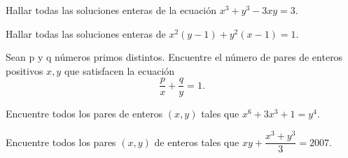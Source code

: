 \begin{exercise}
    Hallar todas las soluciones enteras de la ecuación $x^3 + y^3 - 3xy = 3$.
\end{exercise}

\begin{exercise}
    Hallar todas las soluciones enteras de $x^2(y - 1) + y^2(x - 1) = 1$.
\end{exercise}

\begin{exercise}
    Sean p y q números primos distintos.
    Encuentre el número de pares de enteros positivos $x, y$ que satisfacen la ecuación
    \[
        \frac{p}{x} + \frac{q}{y} = 1.
    \]
\end{exercise}

\begin{problem}
    Encuentre todos los pares de enteros $(x, y)$ tales que $x^6 + 3x^3 + 1 = y^4$.
\end{problem}

\begin{problem}
    Encuentre todos los pares $(x, y)$ de enteros tales que $xy + \dfrac{x^3+ y^3}{3} = 2007$.
\end{problem}